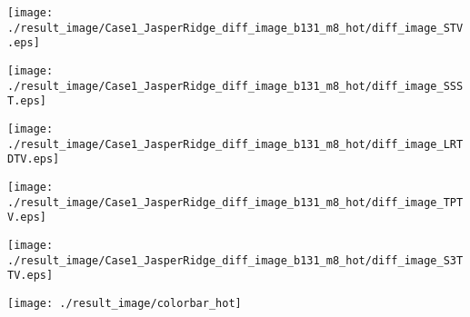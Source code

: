 \begin{figure*}[t]
\begin{center}
        \begin{minipage}{0.150\hsize}
            \centerline{\hspace{\hsize}} %
		\end{minipage}
        \begin{minipage}{0.150\hsize}
            \centerline{\texttt{[image: ./result\_image/Case1\_JasperRidge\_diff\_image\_b131\_m8\_hot/diff\_image\_STV.eps]}} %
        \end{minipage}
        \begin{minipage}{0.150\hsize}
            \centerline{\texttt{[image: ./result\_image/Case1\_JasperRidge\_diff\_image\_b131\_m8\_hot/diff\_image\_SSST.eps]}} %
        \end{minipage}
        \begin{minipage}{0.150\hsize}
            \centerline{\texttt{[image: ./result\_image/Case1\_JasperRidge\_diff\_image\_b131\_m8\_hot/diff\_image\_LRTDTV.eps]}} %
        \end{minipage}
        \begin{minipage}{0.150\hsize}
            \centerline{\texttt{[image: ./result\_image/Case1\_JasperRidge\_diff\_image\_b131\_m8\_hot/diff\_image\_TPTV.eps]}} %
        \end{minipage}
        \begin{minipage}{0.150\hsize}
            \centerline{\texttt{[image: ./result\_image/Case1\_JasperRidge\_diff\_image\_b131\_m8\_hot/diff\_image\_S3TTV.eps]}} %
        \end{minipage}
        \begin{minipage}{0.055\hsize}
            \centerline{\texttt{[image: ./result\_image/colorbar\_hot]}} %
        \end{minipage}

        \vspace{1mm}


\end{center}
\end{figure*}
